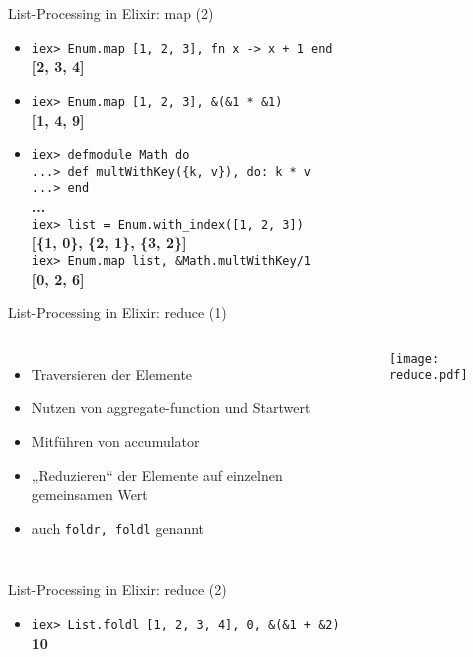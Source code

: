 \documentclass[compress]{beamer}
\begin{document}
  \begin{frame}{List-Processing in Elixir: map (2)}
    \begin{itemize}[<+->]
    \item
      \texttt{iex> Enum.map [1, 2, 3], fn x -> x + 1 end} \\
      \textbf{[2, 3, 4]} \\
    \item
      \texttt{iex> Enum.map [1, 2, 3], \&(\&1 * \&1)} \\
      \textbf{[1, 4, 9]} \\
    \item
      \texttt{iex> defmodule Math do \\
            ...> def multWithKey(\{k, v\}), do: k * v \\
            ...> end\\
      }
      \textbf{...} \\
      \texttt{iex> list = Enum.with\_index([1, 2, 3])} \\
      \textbf{[\{1, 0\}, \{2, 1\}, \{3, 2\}]} \\
      \texttt{iex> Enum.map list, \&Math.multWithKey/1} \\
      \textbf{[0, 2, 6]} \\
    \end{itemize}
  \end{frame}

  \begin{frame}{List-Processing in Elixir: reduce (1)}
    \begin{columns}[c]
      \begin{itemize}
        \item Traversieren der Elemente
        \item Nutzen von aggregate-function und Startwert
        \item Mitführen von accumulator
        \item „Reduzieren“ der Elemente auf einzelnen gemeinsamen Wert
        \item auch \texttt{foldr, foldl} genannt
      \end{itemize}
    \texttt{[image: reduce.pdf]}
    \end{columns}
  \end{frame}

  \begin{frame}{List-Processing in Elixir: reduce (2)}
    \begin{itemize}[<+->]
      \item \texttt{iex> List.foldl [1, 2, 3, 4], 0, \&(\&1 + \&2)} \\
            \textbf{10}
    \end{itemize}
  \end{frame}
\end{document}
